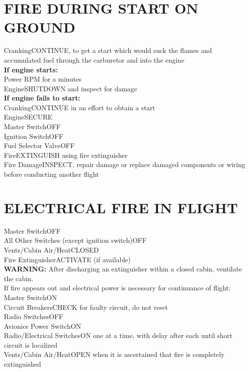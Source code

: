 \documentclass{article}
\begin{document}
\begin{multicols*}{2}
\section*{FIRE DURING START ON GROUND}
Cranking\dotfill CONTINUE, to get a start which would suck the flames and accumulated fuel through the carburetor and into the engine\\
\textbf{If engine starts:}\\
Power RPM for a minutes\\
Engine\dotfill SHUTDOWN and inspect for damage\\
\textbf{If engine fails to start:}\\
Cranking\dotfill CONTINUE in an effort to obtain a start\\
Engine\dotfill SECURE\\
\hspace*{6mm}Master Switch\dotfill OFF\\
\hspace*{6mm}Ignition Switch\dotfill OFF\\
\hspace*{6mm}Fuel Selector Valve\dotfill OFF\\
Fire\dotfill EXTINGUISH using fire extinguisher\\
Fire Damage\dotfill INSPECT, repair damage or replace damaged components or wiring before conducting another flight
\section*{ELECTRICAL FIRE IN FLIGHT}
Master Switch\dotfill OFF\\
All Other Switches (except ignition switch)\dotfill OFF\\
Vents/Cabin Air/Heat\dotfill CLOSED\\
Fire Extinguisher\dotfill ACTIVATE (if available)\\
\centering \textbf{WARNING:}
After discharging an extinguisher within a closed cabin, ventilate the cabin.\\
If fire appears out and electrical power is necessary for continuance of flight:\\
Master Switch\dotfill ON\\
Circuit Breakers\dotfill CHECK for faulty circuit, do not reset\\
Radio Switches\dotfill OFF\\
Avionics Power Switch\dotfill ON\\
Radio/Electrical Switches\dotfill ON one at a time, with delay after each until short circuit is localized\\
Vents/Cabin Air/Heat\dotfill OPEN when it is ascertained that fire is completely extinguished

\end{multicols*}
\end{document}
